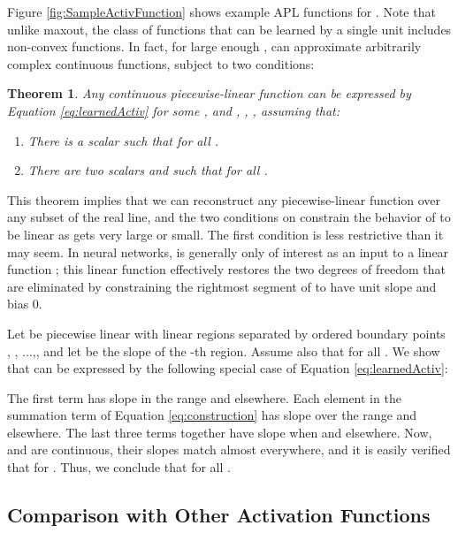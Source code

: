 \documentclass{article} \usepackage{iclr2015,times}
\newtheorem{theorem}{Theorem}
\newenvironment{proof}[1][Proof]{\begin{trivlist}
\item[\hskip \labelsep {\bfseries #1}]}{\end{trivlist}}
\begin{document}
Figure \ref{fig:SampleActivFunction} shows example
APL functions for .  Note that unlike maxout, the class of functions that can be learned by a single unit includes non-convex functions.  In fact, for large
enough ,  can approximate arbitrarily complex continuous functions, subject to two conditions:



\begin{theorem}
\label{thm:universality}
Any continuous piecewise-linear function  can be expressed by
Equation \ref{eq:learnedActiv} for some , and , , , assuming that:
\begin{enumerate}
\item There is a scalar  such that  for all .
\item There are two scalars  and  such that 
for all .
\end{enumerate}
\end{theorem}
This theorem implies that we can reconstruct any piecewise-linear
function  over any subset of the real line, and the two
conditions on  constrain the behavior of  to be linear as
 gets very large or small. The first condition is less restrictive
than it may seem. In neural networks,  is generally only of
interest as an input to a linear function ; this linear
function effectively restores the two degrees of freedom that are
eliminated by constraining the rightmost segment of  to have
unit slope and bias 0.

\begin{proof}
Let  be piecewise linear with  linear regions separated by ordered boundary points , , ...,, and let  be the slope of the -th region. Assume also that  for all .   We show that  can be expressed by the following special case of Equation \ref{eq:learnedActiv}:

The first term has slope  in the range  and  elsewhere. Each element in the summation term of Equation \ref{eq:construction} has slope  over the range  and  elsewhere. The last three terms together have slope  when  and  elsewhere. Now,  and  are continuous, their slopes match almost everywhere, and it is easily verified that  for . Thus, we conclude that  for all . 
\end{proof}



\subsection{Comparison with Other Activation Functions}
\end{document}
